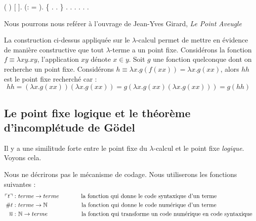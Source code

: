 \documentclass[11pt]{book}
\begin{document}
 \begin{coqdoccode}
\coqdocindent{2.00em}
 ( )  [ ].\coqdoceol
\coqdocindent{2.00em}
 (:   =   ).\coqdoceol
\coqdocindent{2.00em}
\{\coqdoceol
\coqdocindent{4.00em}
 . .\coqdoceol
\coqdocindent{2.00em}
\}\coqdoceol
\coqdocindent{2.00em}
   .\coqdoceol
\coqdocindent{2.00em}
   .\coqdoceol
\coqdocindent{2.00em}
   .\coqdoceol
\coqdocindent{2.00em}
.\coqdoceol
\coqdocnoindent
{}.\coqdoceol
\coqdocemptyline
\coqdocnoindent
{} .\coqdoceol
\end{coqdoccode}

Nous pourrons nous reférer à l'ouvrage de Jean-Yves Girard, \textit{Le Point Aveugle}
\cite{girard}

La construction ci-dessus appliquée sur le $\lambda$-calcul permet de mettre en évidence de 
manière constructive que tout $\lambda$-terme a un point fixe.
Considérons la fonction $f \equiv \lambda xy.xy$, l'application $xy$ dénote $x \in y$.
Soit $g$ une fonction quelconque dont on recherche un point fixe.
Considérons $h\equiv \lambda x.g(f (x x))=\lambda x.g(x x)$, alors $h h$ est 
le point fixe recherché car :
$$
hh=(\lambda x.g(xx))(\lambda x.g(xx))=g(\lambda x.g(xx)(\lambda x.g(xx)))=g(hh)
$$

\subsection{Le point fixe logique et le théorème d'incomplétude de Gödel} %
Il y a une similitude forte entre le point fixe du $\lambda$-calcul et le point fixe \textit{logique}. Voyons cela.

Nous ne décrirons pas le mécanisme de codage. 
Nous utiliserons les fonctions suivantes :
\begin{align*}
\ulcorner t  \urcorner :& \  terme \rightarrow terme \hspace{1.3cm} \text{la fonction qui donne le code syntaxique d'un terme}\\
\#  t :& \  terme \rightarrow \mathbb{N} \hspace{2cm} \text{la fonction qui donne le code numérique d'un terme}\\
\overline{  n } :& \  \mathbb{N} \rightarrow terme \hspace{2cm}  \text{la fonction qui transforme un code numérique
 en code syntaxique}
\end{align*}
\end{document}
